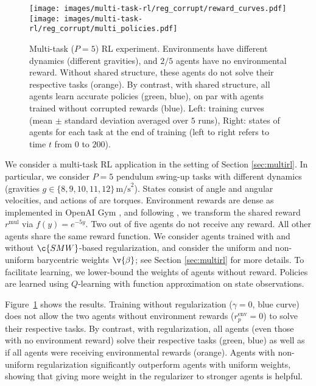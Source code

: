 \documentclass{article}
\begin{document}
\begin{figure}[t!]
\centering
\texttt{[image: images/multi-task-rl/reg\_corrupt/reward\_curves.pdf]}
\hspace{1cm}
\texttt{[image: images/multi-task-rl/reg\_corrupt/multi\_policies.pdf]}
\caption{Multi-task ($P=5$) RL experiment. Environments have different dynamics (different gravities), and  $2\slash 5$ agents have no environmental reward.  Without shared structure, these agents do not solve their respective tasks (orange). By contrast, with  shared structure, all agents learn accurate policies (green, blue), on par with agents trained without corrupted rewards (blue). Left: training curves (mean $\pm$ standard deviation averaged over $5$ runs), Right: states of agents for each task at the end of training (left to right refers to time $t$ from $0$ to $200$).}
\label{fig:pendulum results}
\end{figure}
We consider a multi-task RL application in the setting of Section \ref{sec:multirl}. In particular, we consider $P=5$ pendulum swing-up tasks with different dynamics (gravities $g\in\{8,9,10,11,12\}\,\text{m/s}^2$). States consist of angle and angular velocities, and actions of are torques. Environment rewards are dense as implemented in OpenAI Gym \cite{gym}, and following \textcite{Dadashi2020PrimalWI}, we transform the shared  reward $r^{\text{mul}}$ via $f(y) = e^{-5y}$. Two out of five agents do not receive any reward. All other agents share the same reward function. 
%
We consider agents trained with and without $\c{SMW}$-based regularization, and consider the uniform and non-uniform barycentric weights $\v{\beta}$; see Section \ref{sec:multirl} for more details. To facilitate learning, we lower-bound the weights of agents without reward. Policies are learned using $Q$-learning with function approximation on state observations.

Figure~\ref{fig:pendulum results} shows the results.
Training without regularization ($\gamma=0$, blue curve) does not allow the two agents without environment rewards ($r_p^{\text{env}}=0$) to solve their respective tasks. By contrast, with regularization, all agents (even those with no environment reward) solve their respective tasks (green, blue) as well as if all agents were receiving environmental rewards (orange). Agents with non-uniform regularization significantly outperform agents with uniform weights, showing that giving more weight in the regularizer to stronger agents is helpful. 
\end{document}
